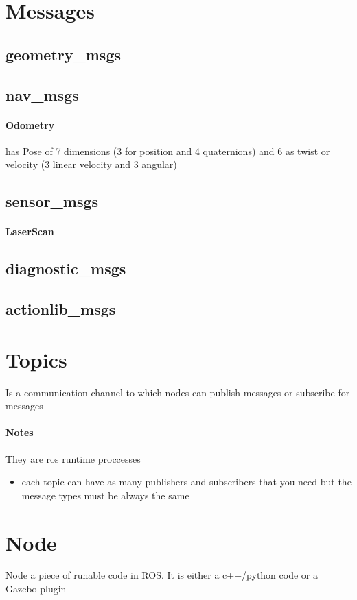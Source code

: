     
\section{Messages}
    \subsection{geometry\_msgs}
    \subsection{nav\_msgs}
        \paragraph{Odometry}
            has Pose of 7 dimensions (3 for position and 4 quaternions) and 6 as twist or velocity (3 linear velocity and 3 angular)
    \subsection{sensor\_msgs}
        \paragraph{LaserScan}
    \subsection{diagnostic\_msgs}
    \subsection{actionlib\_msgs}
\section{Topics}
    Is a communication channel to which nodes can publish messages or subscribe for messages

    \paragraph{Notes}
        They are ros runtime proccesses
        \begin{itemize}
            \item each topic can have as many publishers and subscribers that you need but the message types must be always the same
        \end{itemize}
\section{Node}
    Node a piece of runable code in ROS. It is either a c++/python code or a Gazebo plugin
